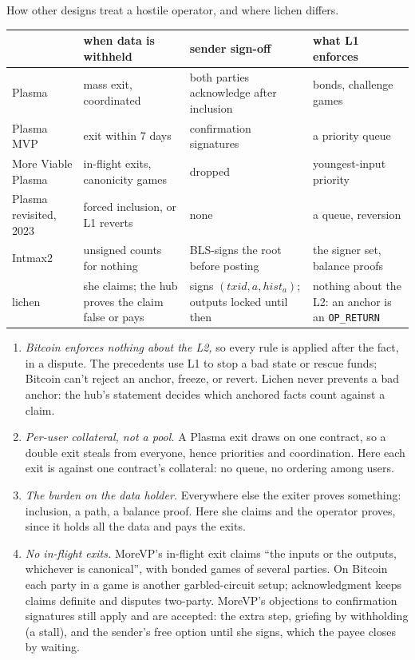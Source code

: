 \documentclass[11pt]{article}
\newcommand{\tx}[1]{\texttt{#1}}
\begin{document}
How other designs treat a hostile operator, and where lichen differs.
\begin{center}
\small
\begin{tabularx}{\linewidth}{>{\raggedright\arraybackslash}p{26mm}>{\raggedright\arraybackslash}p{38mm}>{\raggedright\arraybackslash}p{30mm}L}
\toprule
& when data is withheld & sender sign-off & what L1 enforces \\
\midrule
Plasma~\cite{plasma} & mass exit, coordinated & both parties acknowledge after inclusion & bonds, challenge games \\
Plasma MVP~\cite{plasmamvp} & exit within 7 days & confirmation signatures & a priority queue \\
More Viable Plasma~\cite{morevp} & in-flight exits, canonicity games & dropped & youngest-input priority \\
Plasma revisited, 2023~\cite{neoplasma} & forced inclusion, or L1 reverts & none & a queue, reversion \\
Intmax2~\cite{intmax2} & unsigned counts for nothing & BLS-signs the root before posting & the signer set, balance proofs \\
lichen & she claims; the hub proves the claim false or pays & signs $(\mathit{txid}, a, \mathit{hist}_a)$; outputs locked until then & nothing about the L2: an anchor is an \tx{OP\_RETURN} \\
\bottomrule
\end{tabularx}
\end{center}
\begin{enumerate}[leftmargin=1.5em]
\item \emph{Bitcoin enforces nothing about the L2,} so every rule is
  applied after the fact, in a dispute. The precedents use L1 to stop a
  bad state or rescue funds; Bitcoin can't reject an anchor, freeze, or
  revert. Lichen never prevents a bad anchor: the hub's statement
  decides which anchored facts count against a claim.
\item \emph{Per-user collateral, not a pool.} A Plasma exit draws on one
  contract, so a double exit steals from everyone, hence priorities and
  coordination. Here each exit is against one contract's collateral: no
  queue, no ordering among users.
\item \emph{The burden on the data holder.} Everywhere else the exiter
  proves something: inclusion, a path, a balance proof. Here she claims
  and the operator proves, since it holds all the data and pays the
  exits.
\item \emph{No in-flight exits.} MoreVP's in-flight exit claims ``the
  inputs or the outputs, whichever is canonical'', with bonded games of
  several parties. On Bitcoin each party in a game is another
  garbled-circuit setup; acknowledgment keeps claims definite and
  disputes two-party. MoreVP's objections to confirmation signatures
  still apply and are accepted: the extra step, griefing by withholding
  (a stall), and the sender's free option until she signs, which the
  payee closes by waiting.
\end{enumerate}
\end{document}
